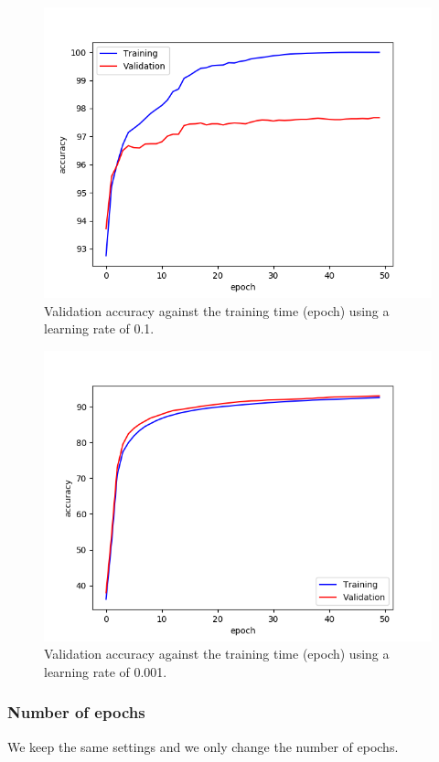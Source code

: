 \documentclass[a4paper]{article}
\begin{document}
\begin{enumerate}
\begin{figure}
\centering
\includegraphics[width=1\textwidth]{lr2.png}
\caption{\label{fig:lr2}Validation accuracy against the training time (epoch) using a learning rate of 0.1.}
\end{figure}

\begin{figure}
\centering
\includegraphics[width=1\textwidth]{lr3.png}
\caption{\label{fig:lr3}Validation accuracy against the training time (epoch) using a learning rate of 0.001.}
\end{figure}


\subsubsection{Number of epochs}
We keep the same settings and we only change the number of epochs.


\end{enumerate}
\end{document}
